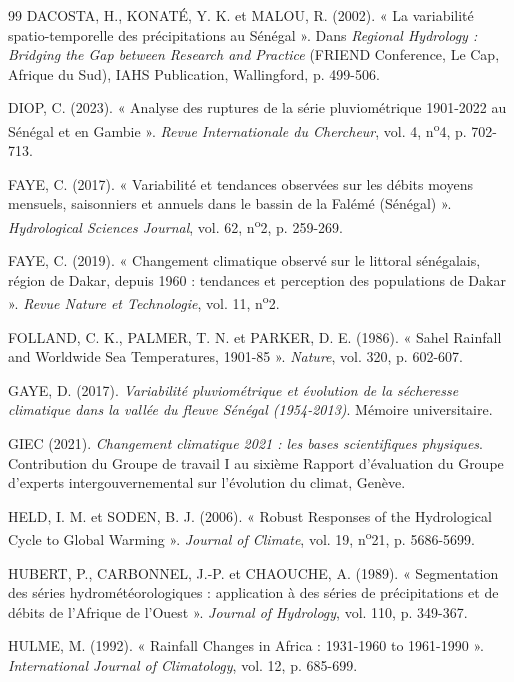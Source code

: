 \documentclass[12pt,a4paper]{report}
\begin{document}
\begin{thebibliography}{99}
DACOSTA, H., KONATÉ, Y. K. et MALOU, R. (2002). « La variabilité spatio-temporelle des précipitations au Sénégal ». Dans \textit{Regional Hydrology : Bridging the Gap between Research and Practice} (FRIEND Conference, Le Cap, Afrique du Sud), IAHS Publication, Wallingford, p. 499-506.

DIOP, C. (2023). « Analyse des ruptures de la série pluviométrique 1901-2022 au Sénégal et en Gambie ». \textit{Revue Internationale du Chercheur}, vol. 4, n\textsuperscript{o}4, p. 702-713.

FAYE, C. (2017). « Variabilité et tendances observées sur les débits moyens mensuels, saisonniers et annuels dans le bassin de la Falémé (Sénégal) ». \textit{Hydrological Sciences Journal}, vol. 62, n\textsuperscript{o}2, p. 259-269.

FAYE, C. (2019). « Changement climatique observé sur le littoral sénégalais, région de Dakar, depuis 1960 : tendances et perception des populations de Dakar ». \textit{Revue Nature et Technologie}, vol. 11, n\textsuperscript{o}2.

FOLLAND, C. K., PALMER, T. N. et PARKER, D. E. (1986). « Sahel Rainfall and Worldwide Sea Temperatures, 1901-85 ». \textit{Nature}, vol. 320, p. 602-607.

GAYE, D. (2017). \textit{Variabilité pluviométrique et évolution de la sécheresse climatique dans la vallée du fleuve Sénégal (1954-2013)}. Mémoire universitaire.

GIEC (2021). \textit{Changement climatique 2021 : les bases scientifiques physiques}. Contribution du Groupe de travail I au sixième Rapport d'évaluation du Groupe d'experts intergouvernemental sur l'évolution du climat, Genève.

HELD, I. M. et SODEN, B. J. (2006). « Robust Responses of the Hydrological Cycle to Global Warming ». \textit{Journal of Climate}, vol. 19, n\textsuperscript{o}21, p. 5686-5699.

HUBERT, P., CARBONNEL, J.-P. et CHAOUCHE, A. (1989). « Segmentation des séries hydrométéorologiques : application à des séries de précipitations et de débits de l'Afrique de l'Ouest ». \textit{Journal of Hydrology}, vol. 110, p. 349-367.

HULME, M. (1992). « Rainfall Changes in Africa : 1931-1960 to 1961-1990 ». \textit{International Journal of Climatology}, vol. 12, p. 685-699.


\end{thebibliography}
\end{document}
